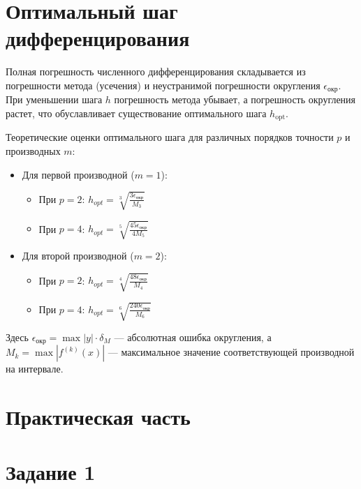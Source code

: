 \documentclass[a4paper]{article}
\begin{document}
\section*{\fontsize{11pt}{0pt}\selectfont\textbf{Оптимальный шаг дифференцирования}}

Полная погрешность численного дифференцирования складывается из погрешности метода (усечения) и неустранимой погрешности округления $\epsilon_{\text{окр}}$. При уменьшении шага $h$ погрешность метода убывает, а погрешность округления растет, что обуславливает существование оптимального шага $h_{\text{opt}}$.

Теоретические оценки оптимального шага для различных порядков точности $p$ и производных $m$:

\begin{itemize}
    \item Для первой производной ($m=1$):
    \begin{itemize}
        \item При $p=2$: $h_{opt} = \sqrt[3]{\frac{3\epsilon_{\text{окр}}}{M_{3}}}$
        \item При $p=4$: $h_{opt} = \sqrt[5]{\frac{45\epsilon_{\text{окр}}}{4M_{5}}}$
    \end{itemize}
    \item Для второй производной ($m=2$):
    \begin{itemize}
        \item При $p=2$: $h_{opt} = \sqrt[4]{\frac{48\epsilon_{\text{окр}}}{M_{4}}}$
        \item При $p=4$: $h_{opt} = \sqrt[6]{\frac{240\epsilon_{\text{окр}}}{M_{6}}}$
    \end{itemize}
\end{itemize}

Здесь $\epsilon_{\text{окр}} = \max|y| \cdot \delta_M$ — абсолютная ошибка округления, а $M_k = \max|f^{(k)}(x)|$ — максимальное значение соответствующей производной на интервале.

\newpage

\section*{\centering\fontsize{14pt}{0pt}\selectfont\textbf{Практическая часть}\label{sec:practice}}

\renewcommand{\arraystretch}{1.4}

\section*{\fontsize{11pt}{0pt}\selectfont\textbf{Задание 1}}
\end{document}
